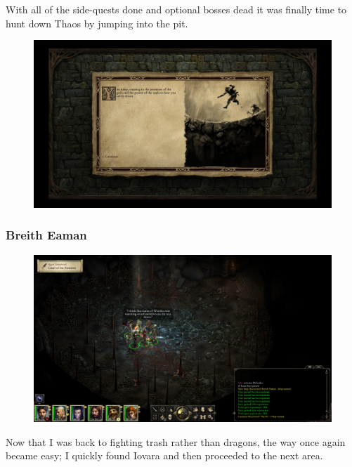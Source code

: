 \documentclass{article}
\begin{document}
With all of the side-quests done and optional bosses dead it was finally time to hunt down Thaos by jumping into the pit.

\begin{figure}
\includegraphics[scale=0.33]{files/blog/2019_03_17_pillars_of_eternity_path_of_the_damned_act_iv/2019_03_17_pit.jpg}
\end{figure}

\subsubsection{Breith Eaman}

\begin{figure}
\includegraphics[scale=0.33]{files/blog/2019_03_17_pillars_of_eternity_path_of_the_damned_act_iv/2019_03_17_breith_eaman1.jpg}
\end{figure}

Now that I was back to fighting trash rather than dragons, the way once again became easy; I quickly found Iovara and then proceeded to the next area.
\end{document}
